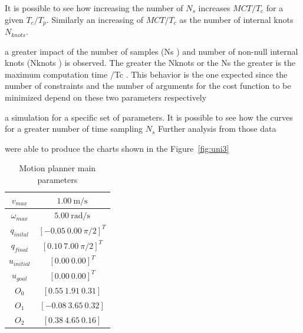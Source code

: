 \documentclass[eprint]{actapoly}
\begin{document}
It is possible to see how increasing the number of $N_s$ increases $MCT/T_c$ for a 
given $T_c/T_p$. Similarly an increasing of $MCT/T_c$ as the number of internal knots
$N_{knots}$.


 a greater impact of the number of samples (Ns ) and number of
non-null internal knots (Nknots ) is observed. The greater the Nknots or the Ns the greater
is the maximum computation time /Tc . This behavior is the one expected since the number
of constraints and the number of arguments for the cost function to be minimized depend
on these two parameters respectively


a simulation for a specific set of parameters.
It is possible to see how the curves for a greater number of time sampling $N_s$
Further analysis from those data


 were able to
produce the charts shown in the Figure~\ref{fig:uni3}

\begin{table}[!h]
\caption {Motion planner main parameters} \label{tab:s3param}
\begin{center}
\begin{tabular}{|c|c|}
\hline
$v_{max}$ & $1.00\ \mathrm{m/s}$\\
\hline
$\omega_{max}$ & $5.00\ \mathrm{rad/s}$\\
\hline
$q_{inital}$ & $[-0.05\ 0.00\ \pi/2]^T$\\
\hline
$q_{final}$ & $[0.10\ 7.00\ \pi/2]^T$\\
\hline
$u_{initial}$ & $[0.00\ 0.00]^T$\\
\hline
$u_{goal}$ & $[0.00\ 0.00]^T$\\
\hline
$O_0$ & $[0.55\ 1.91\ 0.31]$\\
\hline
$O_1$ & $[-0.08\ 3.65\ 0.32]$\\
\hline
$O_2$ & $[0.38\ 4.65\ 0.16]$\\
\hline
\end{tabular}
\end{center}
\end{table}
\end{document}

